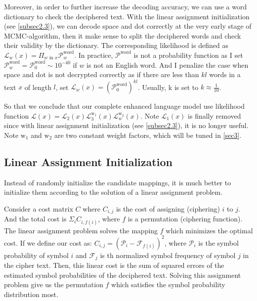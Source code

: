 \documentclass[10pt, twocolumn]{article}
\begin{document}
Moreover, in order to further increase the decoding accuracy, we can use a word dictionary to check the deciphered text. With the linear assignment initialization (see \ref{subsec2.3}), we can decode space and dot correctly at the very early stage of MCMC-algorithm, then it make sense to split the deciphered words and check their validity by the dictionary. The corresponding likelihood is defined as $\mathcal{L}_{w}(x) = \Pi_{w\text{ in }x}\mathcal{P}^{\text{word}}_w$. In practice, $\mathcal{P}^{\text{word}}$ is not a probability function as I set $\mathcal{P}^{\text{word}}_w = \mathcal{P}^{\text{word}}_0 \sim 10^{-40}$ if $w$ is not an English word. And I penalize the case when space and dot is not decrypted correctly as if there are less than $kl$ words in a text $x$ of length $l$, set $\mathcal{L}_{w}(x) = (\mathcal{P}^{\text{word}}_0)^{kl}$. Usually, k is set to $k\approx\frac{1}{10}$.

So that we conclude that our complete enhanced language model use likelihood function $\mathcal{L}(x) = \mathcal{L}_2(x)\mathcal{L}_3^{\mathrm{w}_1}(x)\mathcal{L}_{w}^{\mathrm{w}_2}(x)$. Note $\mathcal{L}_1(x)$ is finally removed since with linear assignment initialization (see \ref{subsec2.3}), it is no longer useful. Note $\mathrm{w}_1$ and $\mathrm{w}_2$ are two constant weight factors, which will be tuned in \ref{sec3}.


\subsection{\label{subsec2.3}Linear Assignment Initialization}
Instead of randomly initialize the candidate mappings, it is much better to initialize them according to the solution of a linear assignment problem.

Consider a cost matrix $C$ where $C_{i, j}$ is the cost of assigning (ciphering) $i$ to $j$. And the total cost is $\Sigma_{i}C_{i, f(i)}$, where $f$ is a permutation (ciphering function). The linear assignment problem solves the mapping $f$ which minimizes the optimal cost. If we define our cost as: $C_{i, j} = (\mathcal{P}_{i} - \mathcal{F}_{f(i)})^2$, where $\mathcal{P}_{i}$ is the symbol probability of symbol $i$ and $\mathcal{F}_{j}$ is th normalized symbol frequency of symbol $j$ in the cipher text. Then, this linear cost is the sum of squared errors of the estimated symbol probabilities of the deciphered text. Solving this assignment problem give us the permutation $f$ which satisfies the symbol probability distribution most.
\end{document}
